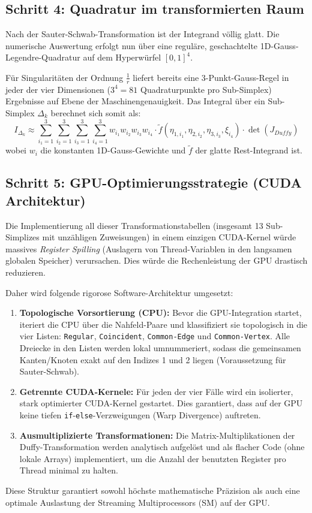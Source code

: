 \documentclass[11pt,a4paper]{article}
\begin{document}
\subsection{Schritt 4: Quadratur im transformierten Raum}
Nach der Sauter-Schwab-Transformation ist der Integrand völlig glatt. Die numerische Auswertung erfolgt nun über eine reguläre, geschachtelte 1D-Gauss-Legendre-Quadratur auf dem Hyperwürfel $[0,1]^4$. 

Für Singularitäten der Ordnung $\frac{1}{r}$ liefert bereits eine 3-Punkt-Gauss-Regel in jeder der vier Dimensionen ($3^4 = 81$ Quadraturpunkte pro Sub-Simplex) Ergebnisse auf Ebene der Maschinengenauigkeit. 
Das Integral über ein Sub-Simplex $\Delta_k$ berechnet sich somit als:
\begin{equation}
    I_{\Delta_k} \approx \sum_{i_1=1}^3 \sum_{i_2=1}^3 \sum_{i_3=1}^3 \sum_{i_4=1}^3 w_{i_1} w_{i_2} w_{i_3} w_{i_4} \cdot \tilde{f}(\eta_{1,i_1}, \eta_{2,i_2}, \eta_{3,i_3}, \xi_{i_4}) \cdot \det(J_{Duffy})
\end{equation}
wobei $w_i$ die konstanten 1D-Gauss-Gewichte und $\tilde{f}$ der glatte Rest-Integrand ist.

\subsection{Schritt 5: GPU-Optimierungsstrategie (CUDA Architektur)}
Die Implementierung all dieser Transformationstabellen (insgesamt 13 Sub-Simplizes mit unzähligen Zuweisungen) in einem einzigen CUDA-Kernel würde massives \textit{Register Spilling} (Auslagern von Thread-Variablen in den langsamen globalen Speicher) verursachen. Dies würde die Rechenleistung der GPU drastisch reduzieren.

Daher wird folgende rigorose Software-Architektur umgesetzt:
\begin{enumerate}
    \item \textbf{Topologische Vorsortierung (CPU):} Bevor die GPU-Integration startet, iteriert die CPU über die Nahfeld-Paare und klassifiziert sie topologisch in die vier Listen: \texttt{Regular}, \texttt{Coincident}, \texttt{Common-Edge} und \texttt{Common-Vertex}. Alle Dreiecke in den Listen werden lokal umnummeriert, sodass die gemeinsamen Kanten/Knoten exakt auf den Indizes 1 und 2 liegen (Voraussetzung für Sauter-Schwab).
    \item \textbf{Getrennte CUDA-Kernele:} Für jeden der vier Fälle wird ein isolierter, stark optimierter CUDA-Kernel gestartet. Dies garantiert, dass auf der GPU keine tiefen \texttt{if}-\texttt{else}-Verzweigungen (Warp Divergence) auftreten.
    \item \textbf{Ausmultiplizierte Transformationen:} Die Matrix-Multiplikationen der Duffy-Transformation werden analytisch aufgelöst und als flacher Code (ohne lokale Arrays) implementiert, um die Anzahl der benutzten Register pro Thread minimal zu halten.
\end{enumerate}
Diese Struktur garantiert sowohl höchste mathematische Präzision als auch eine optimale Auslastung der Streaming Multiprocessors (SM) auf der GPU.
\end{document}
